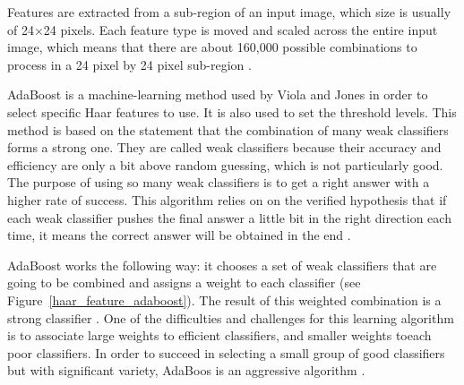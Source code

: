 \vspace{\baselineskip}
\noindent Features are extracted from a sub-region of an input image, which size is usually of 24$\times$24 pixels. Each feature type is moved and scaled across the entire input image, which means that there are about 160,000 possible combinations to process in a 24 pixel by 24 pixel sub-region \cite{SMY07}.
\newline

\noindent AdaBoost is a machine-learning method used by Viola and Jones in order to select specific Haar features to use. It is also used to set the threshold levels. This method is based on the statement that the combination of many weak classifiers forms a strong one. They are called weak classifiers because their accuracy and efficiency are only a bit above random guessing, which is not particularly good. The purpose of using so many weak classifiers is to get a right answer with a higher rate of success. This algorithm relies on on the verified hypothesis that if each weak classifier pushes the final answer a little bit in the right direction each time, it means the correct answer will be obtained in the end \cite{HEW07}. 
\newline

\noindent AdaBoost works the following way: it chooses a set of weak classifiers that are going to be combined and assigns a weight to each classifier (see Figure~\ref{haar_feature_adaboost}). The result of this weighted combination is a strong classifier \cite{HEW07}. One of the difficulties and challenges for this learning algorithm is to associate large weights to efficient classifiers, and smaller weights toeach poor classifiers. In order to succeed in selecting a small group of good classifiers but with significant variety, AdaBoos is an aggressive algorithm \cite{VIO01}.
\newline

